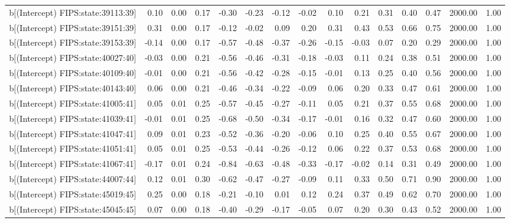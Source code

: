 \begin{table}[ht]
\begin{tabular}{rrrrrrrrrrrrrrr}
  b[(Intercept) FIPS:state:39113:39] & 0.10 & 0.00 & 0.17 & -0.30 & -0.23 & -0.12 & -0.02 & 0.10 & 0.21 & 0.31 & 0.40 & 0.47 & 2000.00 & 1.00 \\ 
  b[(Intercept) FIPS:state:39151:39] & 0.31 & 0.00 & 0.17 & -0.12 & -0.02 & 0.09 & 0.20 & 0.31 & 0.43 & 0.53 & 0.66 & 0.75 & 2000.00 & 1.00 \\ 
  b[(Intercept) FIPS:state:39153:39] & -0.14 & 0.00 & 0.17 & -0.57 & -0.48 & -0.37 & -0.26 & -0.15 & -0.03 & 0.07 & 0.20 & 0.29 & 2000.00 & 1.00 \\ 
  b[(Intercept) FIPS:state:40027:40] & -0.03 & 0.00 & 0.21 & -0.56 & -0.46 & -0.31 & -0.18 & -0.03 & 0.11 & 0.24 & 0.38 & 0.51 & 2000.00 & 1.00 \\ 
  b[(Intercept) FIPS:state:40109:40] & -0.01 & 0.00 & 0.21 & -0.56 & -0.42 & -0.28 & -0.15 & -0.01 & 0.13 & 0.25 & 0.40 & 0.56 & 2000.00 & 1.00 \\ 
  b[(Intercept) FIPS:state:40143:40] & 0.06 & 0.00 & 0.21 & -0.46 & -0.34 & -0.22 & -0.09 & 0.06 & 0.20 & 0.33 & 0.47 & 0.61 & 2000.00 & 1.00 \\ 
  b[(Intercept) FIPS:state:41005:41] & 0.05 & 0.01 & 0.25 & -0.57 & -0.45 & -0.27 & -0.11 & 0.05 & 0.21 & 0.37 & 0.55 & 0.68 & 2000.00 & 1.00 \\ 
  b[(Intercept) FIPS:state:41039:41] & -0.01 & 0.01 & 0.25 & -0.68 & -0.50 & -0.34 & -0.17 & -0.01 & 0.16 & 0.32 & 0.47 & 0.60 & 2000.00 & 1.00 \\ 
  b[(Intercept) FIPS:state:41047:41] & 0.09 & 0.01 & 0.23 & -0.52 & -0.36 & -0.20 & -0.06 & 0.10 & 0.25 & 0.40 & 0.55 & 0.67 & 2000.00 & 1.00 \\ 
  b[(Intercept) FIPS:state:41051:41] & 0.05 & 0.01 & 0.25 & -0.53 & -0.44 & -0.26 & -0.12 & 0.06 & 0.22 & 0.37 & 0.53 & 0.68 & 2000.00 & 1.00 \\ 
  b[(Intercept) FIPS:state:41067:41] & -0.17 & 0.01 & 0.24 & -0.84 & -0.63 & -0.48 & -0.33 & -0.17 & -0.02 & 0.14 & 0.31 & 0.49 & 2000.00 & 1.00 \\ 
  b[(Intercept) FIPS:state:44007:44] & 0.12 & 0.01 & 0.30 & -0.62 & -0.47 & -0.27 & -0.09 & 0.11 & 0.33 & 0.50 & 0.71 & 0.90 & 2000.00 & 1.00 \\ 
  b[(Intercept) FIPS:state:45019:45] & 0.25 & 0.00 & 0.18 & -0.21 & -0.10 & 0.01 & 0.12 & 0.24 & 0.37 & 0.49 & 0.62 & 0.70 & 2000.00 & 1.00 \\ 
  b[(Intercept) FIPS:state:45045:45] & 0.07 & 0.00 & 0.18 & -0.40 & -0.29 & -0.17 & -0.05 & 0.07 & 0.20 & 0.30 & 0.43 & 0.52 & 2000.00 & 1.00 \\ 

\end{tabular}
\end{table}
